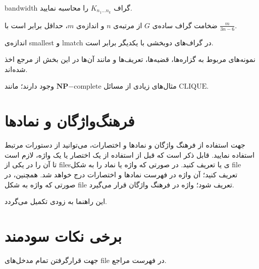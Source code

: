 		\begin{problem}
			\gls{bandwidth} گراف $K_{n_1 \ldots n_k}$ را محاسبه نمایید.
		\end{problem}
		
		\begin{proposition}
			ضخامت گراف ساده‌ی $G$ از مرتبه‌ی $n$ و اندازه‌ی $m$، حداقل برابر است با $\frac{m}{3n-6}$.
		\end{proposition}
		
		\begin{corollary}
اندازه‌ی \gls{smallest} و \gls{lmatch} در گراف‌های دوبخشی با یکدیگر برابر است.
		\end{corollary}
		
		\begin{remark}
			نمونه‌های مربوط به گزاره‌ها، قضیه‌ها، تعریف‌ها و مانند آن‌ها در این بخش از مرجع \cite{west} اخذ شده‌اند.
		\end{remark}
		
		\begin{example}
			مثال‌های زیادی از مسائل $\mathbf{NP}\mathrm{-complete}$ وجود دارند؛ مانند $\mathrm{CLIQUE}$.
		\end{example}		
		\section{فرهنگ‌واژگان و نمادها}\label{sec:gloss}
		جهت استفاده از فرهنگ واژگان و نمادها و اختصارات، می‌توانید از دستورات مرتبط استفاده نمایید. قابل ذکر است که قبل از استفاده از یک اختصار یا یک واژه، لازم است تا آن را در یکی از \glspl{file}ی  یا  تعریف کنید. در صورتی که واژه یا نماد را به شکل \gls{file}  تعریف کنید؛ آن واژه در فهرست نماد‌ها و اختصارات درج خواهد شد. همچنین، در صورتی که واژه به شکل \gls{file}  تعریف شود؛ واژه در فرهنگ واژگان قرار می‌گیرد.
		
		این راهنما به زودی تکمیل می‌گردد.
		\section{برخی نکات سودمند}\label{sec:faq}
			جهت قرارگرفتن تمام مدخل‌های \gls{file} \cite{*} در فهرست مراجع.
	